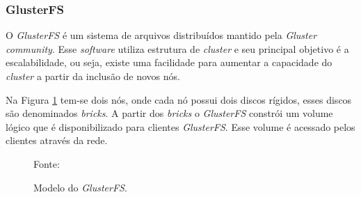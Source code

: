 \subsubsection{GlusterFS}
\label{section:glusterfs}
O \textit{GlusterFS} \cite{glusterfs} é um sistema de arquivos distribuídos mantido pela \textit{Gluster community}. Esse \textit{software} 
utiliza estrutura de \textit{cluster} e seu principal objetivo é a escalabilidade, ou seja, existe uma facilidade para aumentar a capacidade 
do \textit{cluster} a partir da inclusão de novos nós.

Na Figura \ref{fig:glusterfs} tem-se dois nós, onde cada nó possui dois discos rígidos, esses discos são denominados \textit{bricks}. 
A partir dos \textit{bricks} o \textit{GlusterFS} constrói um volume lógico que é disponibilizado para clientes \textit{GlusterFS}.
Esse volume é acessado pelos clientes através da rede.

\begin{figure}[h!]
 \centering
 \caption{Modelo do \textit{GlusterFS}.}
 Fonte: \citet{davies2013}
 \label{fig:glusterfs}
\end{figure}

